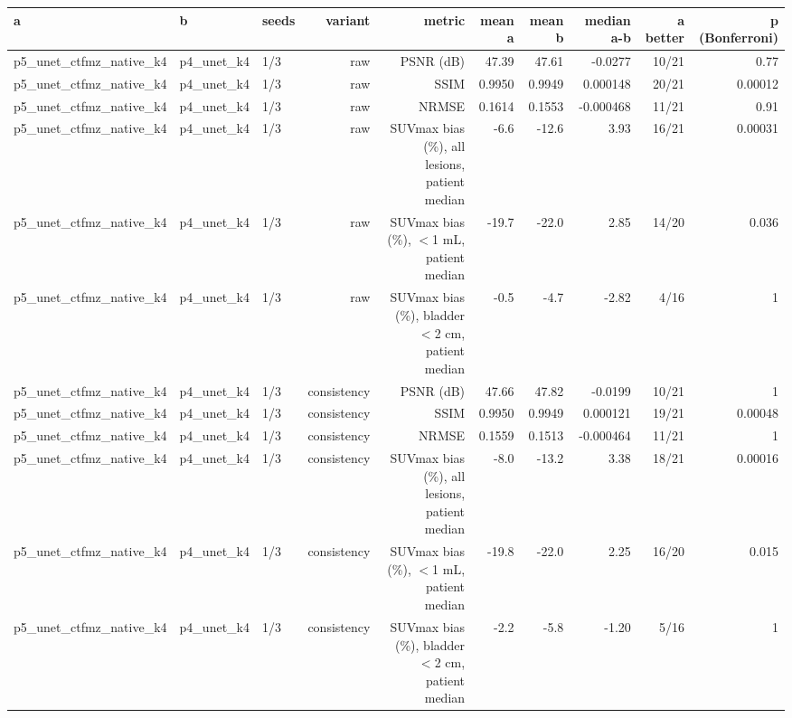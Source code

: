 \begin{tabular}{lllrrrrrrr}
\toprule
a & b & seeds & variant & metric & mean a & mean b & median a-b & a better & p (Bonferroni) \\
\midrule
p5\_unet\_ctfmz\_native\_k4 & p4\_unet\_k4 & 1/3 & raw & PSNR (dB) & 47.39 & 47.61 & -0.0277 & 10/21 & 0.77 \\
p5\_unet\_ctfmz\_native\_k4 & p4\_unet\_k4 & 1/3 & raw & SSIM & 0.9950 & 0.9949 & 0.000148 & 20/21 & 0.00012 \\
p5\_unet\_ctfmz\_native\_k4 & p4\_unet\_k4 & 1/3 & raw & NRMSE & 0.1614 & 0.1553 & -0.000468 & 11/21 & 0.91 \\
p5\_unet\_ctfmz\_native\_k4 & p4\_unet\_k4 & 1/3 & raw & SUVmax bias (\%), all lesions, patient median & -6.6 & -12.6 & 3.93 & 16/21 & 0.00031 \\
p5\_unet\_ctfmz\_native\_k4 & p4\_unet\_k4 & 1/3 & raw & SUVmax bias (\%), $<$1 mL, patient median & -19.7 & -22.0 & 2.85 & 14/20 & 0.036 \\
p5\_unet\_ctfmz\_native\_k4 & p4\_unet\_k4 & 1/3 & raw & SUVmax bias (\%), bladder $<$2 cm, patient median & -0.5 & -4.7 & -2.82 & 4/16 & 1 \\
p5\_unet\_ctfmz\_native\_k4 & p4\_unet\_k4 & 1/3 & consistency & PSNR (dB) & 47.66 & 47.82 & -0.0199 & 10/21 & 1 \\
p5\_unet\_ctfmz\_native\_k4 & p4\_unet\_k4 & 1/3 & consistency & SSIM & 0.9950 & 0.9949 & 0.000121 & 19/21 & 0.00048 \\
p5\_unet\_ctfmz\_native\_k4 & p4\_unet\_k4 & 1/3 & consistency & NRMSE & 0.1559 & 0.1513 & -0.000464 & 11/21 & 1 \\
p5\_unet\_ctfmz\_native\_k4 & p4\_unet\_k4 & 1/3 & consistency & SUVmax bias (\%), all lesions, patient median & -8.0 & -13.2 & 3.38 & 18/21 & 0.00016 \\
p5\_unet\_ctfmz\_native\_k4 & p4\_unet\_k4 & 1/3 & consistency & SUVmax bias (\%), $<$1 mL, patient median & -19.8 & -22.0 & 2.25 & 16/20 & 0.015 \\
p5\_unet\_ctfmz\_native\_k4 & p4\_unet\_k4 & 1/3 & consistency & SUVmax bias (\%), bladder $<$2 cm, patient median & -2.2 & -5.8 & -1.20 & 5/16 & 1 \\
\bottomrule
\end{tabular}
